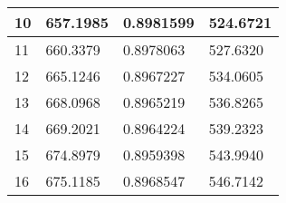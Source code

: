 \documentclass{article}\usepackage[]{graphicx}\usepackage[]{color}
\begin{document}
\begin{table}[h]
\begin{tabular}{|llll|}
\multicolumn{1}{|l|}{10}                                                                                                                                                                                                                   & \multicolumn{1}{l|}{657.1985}      & \multicolumn{1}{l|}{0.8981599}         & 524.6721     \\ \hline
\multicolumn{1}{|l|}{11}                                                                                                                                                                                                                   & \multicolumn{1}{l|}{660.3379}      & \multicolumn{1}{l|}{0.8978063}         & 527.6320     \\ \hline
\multicolumn{1}{|l|}{12}                                                                                                                                                                                                                   & \multicolumn{1}{l|}{665.1246}      & \multicolumn{1}{l|}{0.8967227}         & 534.0605     \\ \hline
\multicolumn{1}{|l|}{13}                                                                                                                                                                                                                   & \multicolumn{1}{l|}{668.0968}      & \multicolumn{1}{l|}{0.8965219}         & 536.8265     \\ \hline
\multicolumn{1}{|l|}{14}                                                                                                                                                                                                                   & \multicolumn{1}{l|}{669.2021}      & \multicolumn{1}{l|}{0.8964224}         & 539.2323     \\ \hline
\multicolumn{1}{|l|}{15}                                                                                                                                                                                                                   & \multicolumn{1}{l|}{674.8979}      & \multicolumn{1}{l|}{0.8959398}         & 543.9940     \\ \hline
\multicolumn{1}{|l|}{16}                                                                                                                                                                                                                   & \multicolumn{1}{l|}{675.1185}      & \multicolumn{1}{l|}{0.8968547}         & 546.7142     \\ \hline

\end{tabular}
\end{table}
\end{document}
